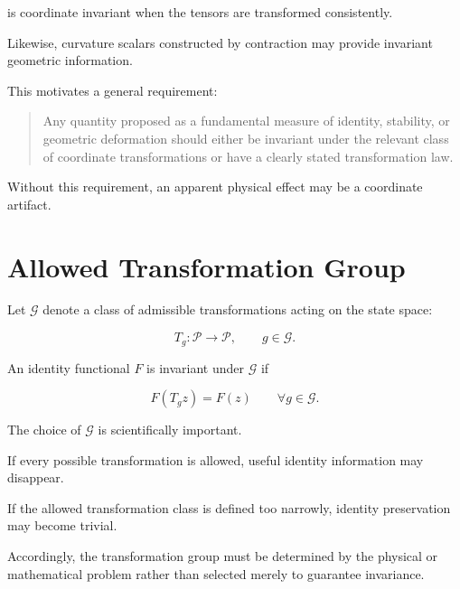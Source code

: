 \documentclass[12pt,oneside]{book}
\begin{document}
is coordinate invariant when the tensors are transformed
consistently.

Likewise, curvature scalars constructed by contraction may
provide invariant geometric information.

This motivates a general requirement:

\begin{quote}
Any quantity proposed as a fundamental measure of identity,
stability, or geometric deformation should either be invariant
under the relevant class of coordinate transformations or have
a clearly stated transformation law.
\end{quote}

Without this requirement, an apparent physical effect may be a
coordinate artifact.


\section{Allowed Transformation Group}
\label{sec:allowed-transformations}

Let \(\mathcal{G}\) denote a class of admissible
transformations acting on the state space:

\begin{equation}
    T_g:
    \mathcal{P}
    \rightarrow
    \mathcal{P},
    \qquad
    g\in\mathcal{G}.
    \label{eq:transformation-group-action}
\end{equation}

An identity functional \(F\) is invariant under
\(\mathcal{G}\) if

\begin{equation}
    F(T_g z)
    =
    F(z)
    \qquad
    \forall g\in\mathcal{G}.
    \label{eq:group-identity-invariance}
\end{equation}

The choice of \(\mathcal{G}\) is scientifically important.

If every possible transformation is allowed, useful identity
information may disappear.

If the allowed transformation class is defined too narrowly,
identity preservation may become trivial.

Accordingly, the transformation group must be determined by the
physical or mathematical problem rather than selected merely to
guarantee invariance.
\end{document}
